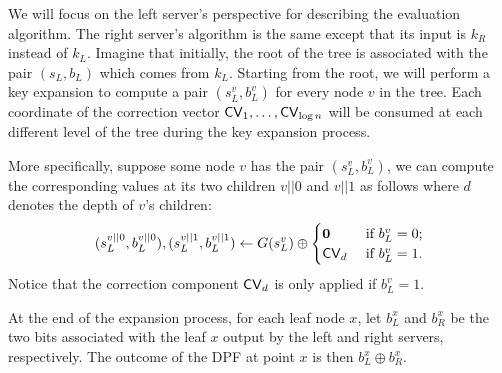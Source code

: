 We will focus on the left server's perspective
for describing the evaluation algorithm. 
The right server's algorithm is the same except
that its input is $k_R$ instead of $k_L$.
Imagine that initially, the root of the tree is associated
with the pair $(s_L, b_L)$ which comes from $k_L$. 
Starting from the root, we will perform a key expansion
to compute a pair $(s_L^v, b_L^v)$
for every node $v$ in the tree.
 Each coordinate of the correction  
vector ${\sf CV}_1, \ldots, {\sf CV}_{\log n}$ 
will be consumed at each different level of the tree during the key expansion
process. 

More specifically, suppose some node $v$ has the pair
$(s_L^v, b_L^v)$, we can compute
the corresponding values at its two children $v||0$ and $v||1$ as follows
where $d$ denotes the depth of $v$'s children:
\[ 
(s_L^{v||0}, b_L^{v||0}), (s_L^{v||1}, b_L^{v||1}) \leftarrow G(s_L^v) \oplus
 \begin{cases} 
    {\bf 0} & \text{ if } b_L^v = 0; \\
    {\sf CV}_d &  \text { if } b_L^v= 1. \\
 \end{cases}
\]
Notice that the correction component ${\sf CV}_d$ is only applied if $b_L^v =1$.

At the end of the expansion process, 
for each leaf node $x$, let $b_L^x$ and $b_R^x$ be
the two bits associated with the leaf $x$ 
output by the left and right servers, respectively. 
The outcome of the DPF at point $x$ is then $b_L^x \oplus b_R^x$. 

